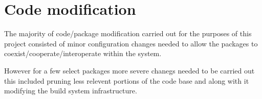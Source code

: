 \section{Code modification}\label{Code modification}

The majority of code/package modification carried out for the purposes of this project consisted of minor configuration changes needed to allow the packages to coexist/cooperate/interoperate within the system.

However for a few select packages more severe chanegs needed to be carried out this included pruning less relevent portions of the code base and along with it modifying the build system infrastructure.
